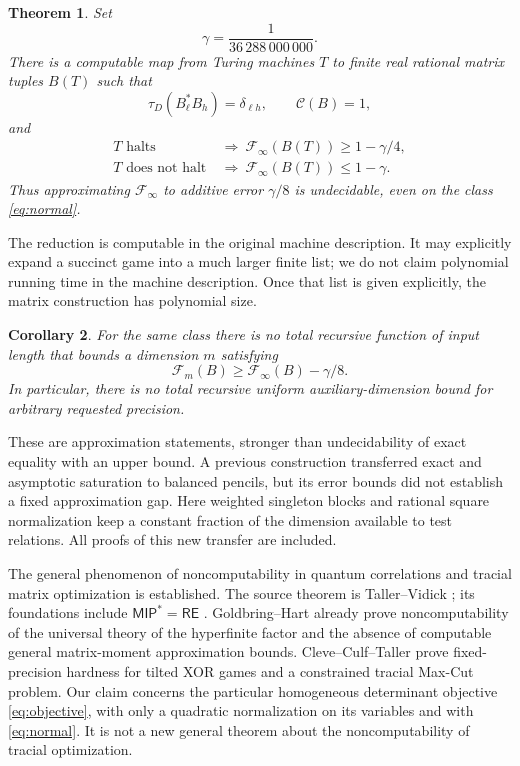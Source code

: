 \documentclass[11pt,a4paper]{article}
\newtheorem{theorem}{Theorem}
\newtheorem{corollary}[theorem]{Corollary}
\newcommand{\F}{\mathcal F}
\newcommand{\K}{\mathcal C}
\begin{document}
\newpage
\begin{theorem}\label{thm:main}
Set
\[
 \gamma=\frac1{36\,288\,000\,000}.
\]
There is a computable map from Turing machines $T$ to finite real rational matrix tuples $B(T)$ such that
\begin{equation}
 \tau_D(B_\ell^*B_h)=\delta_{\ell h},
 \qquad \K(B)=1,                                      \label{eq:normal}
\end{equation}
and
\begin{align}
 T\text{ halts}&\ \Longrightarrow\
       \F_\infty(B(T))\ge1-\gamma/4, \label{eq:yes}\\
 T\text{ does not halt}&\ \Longrightarrow\
       \F_\infty(B(T))\le1-\gamma.   \label{eq:no}
\end{align}
Thus approximating $\F_\infty$ to additive error $\gamma/8$ is undecidable, even on the class \eqref{eq:normal}.
\end{theorem}

The reduction is computable in the original machine description. It may explicitly expand a succinct game into a much larger finite list; we do not claim polynomial running time in the machine description. Once that list is given explicitly, the matrix construction has polynomial size.

\begin{corollary}\label{cor:dimension}
For the same class there is no total recursive function of input length that bounds a dimension $m$ satisfying
\[
 \F_m(B)\ge\F_\infty(B)-\gamma/8.
\]
In particular, there is no total recursive uniform auxiliary-dimension bound for arbitrary requested precision.
\end{corollary}

These are approximation statements, stronger than undecidability of exact equality with an upper bound. A previous construction \cite{prior} transferred exact and asymptotic saturation to balanced pencils, but its error bounds did not establish a fixed approximation gap. Here weighted singleton blocks and rational square normalization keep a constant fraction of the dimension available to test relations. All proofs of this new transfer are included.

The general phenomenon of noncomputability in quantum correlations and tracial matrix optimization is established. The source theorem is Taller--Vidick \cite{tv}; its foundations include $\mathsf{MIP}^*=\mathsf{RE}$ \cite{mip}. Goldbring--Hart \cite{gh} already prove noncomputability of the universal theory of the hyperfinite factor and the absence of computable general matrix-moment approximation bounds. Cleve--Culf--Taller \cite{cct} prove fixed-precision hardness for tilted XOR games and a constrained tracial Max-Cut problem. Our claim concerns the particular homogeneous determinant objective \eqref{eq:objective}, with only a quadratic normalization on its variables and with \eqref{eq:normal}. It is not a new general theorem about the noncomputability of tracial optimization.
\end{document}

